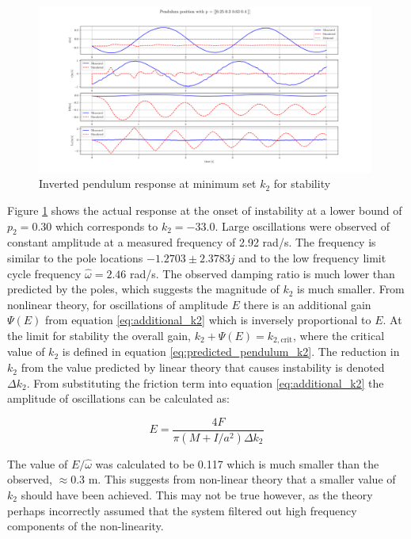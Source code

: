 \documentclass{article}
\begin{document}
\begin{figure}[H]
  \centering
  \includegraphics[width=0.99\textwidth]{figures/4.4_lo.png}
  \caption{Inverted pendulum response at minimum set $k_2$ for stability}
  \label{fig:roots4.4_lo}
\end{figure}

Figure \ref{fig:roots4.4_lo} shows the actual response at the onset of instability at a lower bound of $p_2 = 0.30$ which corresponds to $k_2 = -33.0$.
Large oscillations were observed of constant amplitude at a measured frequency of 2.92 rad/s.
The frequency is similar to the pole locations $-1.2703 \pm 2.3783j$ and to the low frequency limit cycle frequency $\hat{\omega}= 2.46$ rad/s.
The observed damping ratio is much lower than predicted by the poles, which suggests the magnitude of $k_2$ is much smaller.
From nonlinear theory, for oscillations of amplitude $E$ there is an additional gain $\Psi(E)$ from equation \ref{eq:additional_k2} which is inversely proportional to $E$.
At the limit for stability the overall gain, $k_2 + \Psi(E) = k_{2,\text{crit}}$, where the critical value of $k_2$ is defined in equation \ref{eq:predicted_pendulum_k2}.
The reduction in $k_2$ from the value predicted by linear theory that causes instability is denoted $\Delta k_2$.
From substituting the friction term into equation \ref{eq:additional_k2} the amplitude of oscillations can be calculated as:

\begin{equation}
  E = \frac{4F}{\pi(M + I/a^2)\Delta k_2}
\end{equation}

The value of $E/\hat{\omega}$ was calculated to be 0.117 which is much smaller than the observed, $\approx 0.3$ m.
This suggests from non-linear theory that a smaller value of $k_2$ should have been achieved.
This may not be true however, as the theory perhaps incorrectly assumed that the system filtered out high frequency components of the non-linearity.
\end{document}
